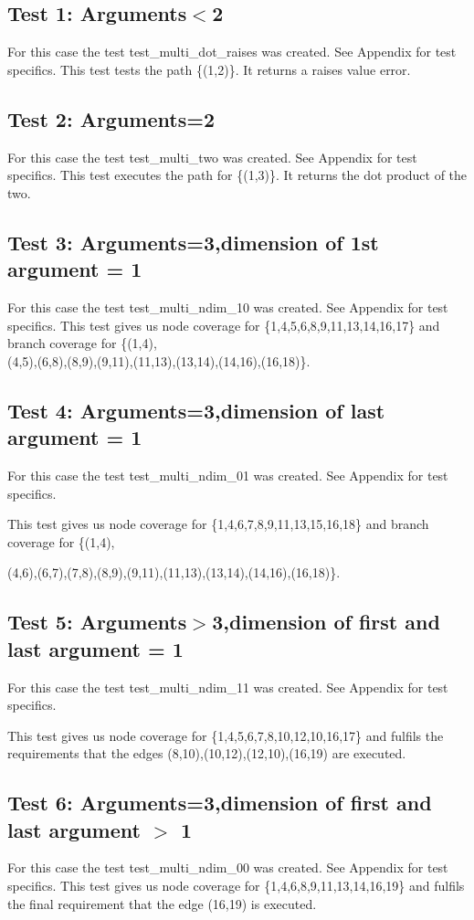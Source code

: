 \subsection{Test 1: Arguments$<$2}
For this case the test test\_multi\_dot\_raises was created. See Appendix for test specifics.
This test tests the path \{(1,2)\}. It returns a raises value error.


\subsection{Test 2: Arguments=2}

For this case the test test\_multi\_two was created. See Appendix for test specifics.
This test executes the path for \{(1,3)\}. It returns the dot product of the two.


\subsection{Test 3: Arguments=3,dimension of 1st argument = 1}

For this case the test test\_multi\_ndim\_10 was created. See Appendix for test specifics.
This test gives us node coverage for \{1,4,5,6,8,9,11,13,14,16,17\} and branch coverage for \{(1,4),
\\
(4,5),(6,8),(8,9),(9,11),(11,13),(13,14),(14,16),(16,18)\}.




\subsection{Test 4: Arguments=3,dimension of last argument = 1}

For this case the test test\_multi\_ndim\_01 was created. See Appendix for test specifics.

This test gives us node coverage for \{1,4,6,7,8,9,11,13,15,16,18\} and branch coverage for \{(1,4),

(4,6),(6,7),(7,8),(8,9),(9,11),(11,13),(13,14),(14,16),(16,18)\}.



\subsection{Test 5: Arguments$>$3,dimension of first and last argument = 1}

For this case the test test\_multi\_ndim\_11 was created. See Appendix for test specifics.

This test gives us node coverage for \{1,4,5,6,7,8,10,12,10,16,17\} and fulfils the requirements that the edges {(8,10),(10,12),(12,10),(16,19)} are executed.


\subsection{Test 6: Arguments=3,dimension of first and last argument $>$ 1}


For this case the test test\_multi\_ndim\_00 was created. See Appendix for test specifics.
This test gives us node coverage for \{1,4,6,8,9,11,13,14,16,19\} and fulfils the final requirement that the edge (16,19) is executed.


